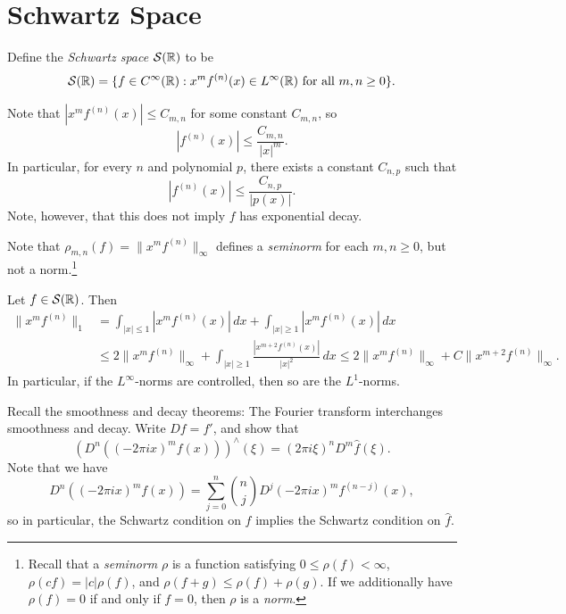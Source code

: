 \section{Schwartz Space}

\begin{definition}
  Define the \emph{Schwartz space}
  $\mathcal{S}(\mathbb{R})$ to be
  \[
    \mathcal{S}(\mathbb{R})
    = \{
      f \in C^\infty(\mathbb{R}) :
      x^m f^{(n)}(x) \in L^\infty(\mathbb{R})
      \text{ for all } m, n \ge 0
    \}.
  \]
\end{definition}

\begin{remark}
  Note that $|x^m f^{(n)}(x)| \le C_{m, n}$
  for some constant $C_{m, n}$, so
  \[
    |f^{(n)}(x)| \le \frac{C_{m, n}}{|x|^m}.
  \]
  In particular, for every $n$ and polynomial $p$,
  there exists a constant $C_{n, p}$ such that
  \[
    |f^{(n)}(x)| \le \frac{C_{n, p}}{|p(x)|}.
  \]
  Note, however, that this does
  not imply $f$ has exponential decay.
\end{remark}

\begin{remark}
  Note that $\rho_{m, n}(f) = \|x^m f^{(n)}\|_\infty$
  defines a \emph{seminorm} for each $m, n \ge 0$, but not a norm.\footnote{Recall that a \emph{seminorm} $\rho$ is a function satisfying $0 \le \rho(f) < \infty$, $\rho(cf) = |c| \rho(f)$, and $\rho(f + g) \le \rho(f) + \rho(g)$. If we additionally have $\rho(f) = 0$ if and only if $f = 0$, then $\rho$ is a \emph{norm}.}
\end{remark}

\begin{remark}
  Let $f \in \mathcal{S}(\mathbb{R})$. Then
  \begin{align*}
    \|x^m f^{(n)}\|_1
    &= \int_{|x| \le 1} |x^m f^{(n)}(x)| \, dx
    + \int_{|x| \ge 1} |x^m f^{(n)}(x)| \, dx \\
    &\le 2 \|x^m f^{(n)}\|_\infty
    + \int_{|x| \ge 1} \frac{|x^{m + 2} f^{(n)}(x)|}{|x|^2} \, dx
    \le 2 \|x^m f^{(n)}\|_\infty
    + C \|x^{m + 2} f^{(n)}\|_\infty.
  \end{align*}
  In particular, if the
  $L^\infty$-norms are controlled, then
  so are the $L^1$-norms.
\end{remark}

\begin{exercise}
  Recall the smoothness and decay theorems:
  The Fourier transform interchanges
  smoothness and decay. Write
  $Df = f'$, and show that
  \[
    (D^n((-2\pi i x)^m f(x)))^\wedge(\xi)
    = (2\pi i \xi)^n D^m \widehat{f}(\xi).
  \]
  Note that we have
  \[
    D^n((-2\pi i x)^m f(x))
    = \sum_{j = 0}^n \binom{n}{j} D^j (-2\pi i x)^m f^{(n - j)}(x),
  \]
  so in particular, the Schwartz condition
  on $f$
  implies the Schwartz condition on
  $\widehat{f}$.
\end{exercise}

